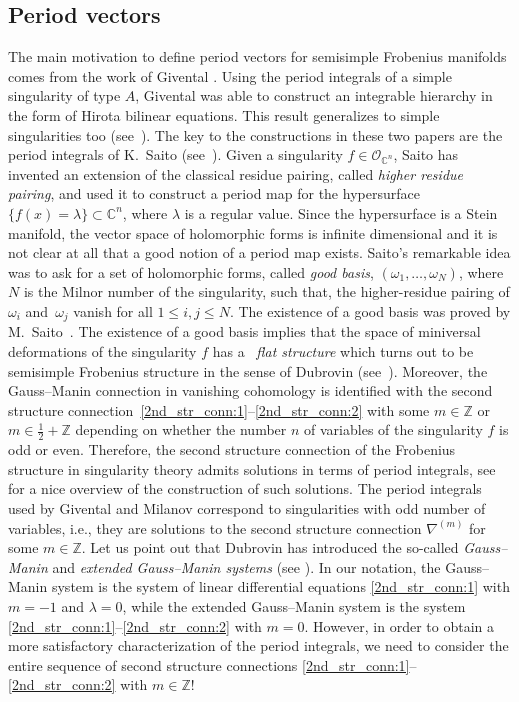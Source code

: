 \documentclass[10pt,a4paper]{article}
\numberwithin{equation}{section}
\newcommand{\CC}{\mathbb{C}}
\newcommand{\ZZ}{\mathbb{Z}}
\renewcommand{\O}{\mathcal{O}}
\begin{document}
\subsection{Period vectors}
The main motivation to define period vectors for semisimple Frobenius
manifolds comes from the work of Givental \cite{Giv-AnKdV}. Using the period
integrals of a simple singularity of type $A$, Givental was able to
construct an integrable
hierarchy in the form of Hirota bilinear equations. This result generalizes
to simple singularities too (see~\cite{GM2005}). The key to the
constructions in these two papers are the period integrals of
K.~Saito (see~\cite{Saito1983}). Given a singularity $f\in \O_{\CC^n}$, Saito has
invented an extension of the classical residue pairing, called {\em
 higher residue pairing}, and used it to
construct a period map for the hypersurface
$\{f(x)=\lambda\}\subset \CC^n$, where $\lambda$ is a regular value.
Since the hypersurface is a Stein manifold, the vector space of holomorphic forms is
infinite dimensional and it is not clear at all that a
good notion of a period map exists. Saito's remarkable idea was to
ask for a set of holomorphic forms, called {\em good basis},
$(\omega_1,\dots,\omega_N)$, where~$N$ is the Milnor number of the singularity, such that, the
higher-residue pairing of $\omega_i$ and~$\omega_j$ vanish for all $1\leq
i,j\leq N$. The existence of a good basis was proved by M.~Saito~\cite{MSaito1989}. The existence of a good basis implies that the
space of miniversal deformations of the singularity $f$ has a~{\em
 flat structure} which turns out to be semisimple Frobenius
structure in the sense of Dubrovin (see~\cite{hertling_2002}). Moreover, the Gauss--Manin
connection in vanishing cohomology is identified with
the second structure connection~\eqref{2nd_str_conn:1}--\eqref{2nd_str_conn:2} with some $m\in \ZZ$ or
$m\in \tfrac{1}{2}+\ZZ$ depending on whether the number $n$ of variables
of the singularity $f$ is odd or even. Therefore, the second structure
connection of the Frobenius structure in singularity theory admits
solutions in terms of period integrals, see~\cite[Section~3.1]{FGM2010} for a nice overview of the construction of such
solutions. The period integrals used by
Givental and Milanov correspond to singularities with odd number of
variables, i.e., they are solutions to the second structure connection
$\nabla^{(m)}$ for some $m\in \ZZ$. Let us point out that Dubrovin
has introduced the so-called {\em Gauss--Manin} and {\em
extended Gauss--Manin systems} (see \cite[equations~(5.9), (5.11) and (5.12)]{Dubrovin1999}). In our notation, the Gauss--Manin system
 is the system of linear differential equations \eqref{2nd_str_conn:1} with $m=-1$
 and $\lambda=0$, while the extended Gauss--Manin system is the system
\eqref{2nd_str_conn:1}--\eqref{2nd_str_conn:2} with $m=0$. However,
in order to obtain a more satisfactory characterization of the period
integrals, we need to
consider the entire sequence of second structure connections
\eqref{2nd_str_conn:1}--\eqref{2nd_str_conn:2} with $m\in \ZZ$!
\end{document}
